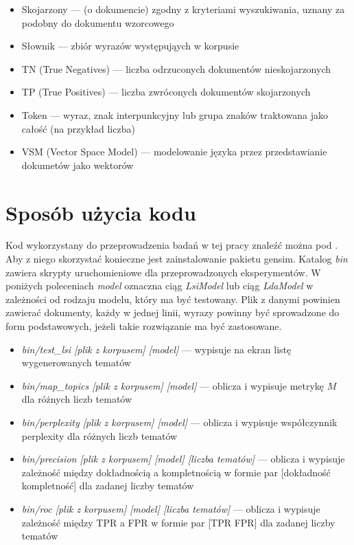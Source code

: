 \documentclass[11pt,a4paper]{article}
\begin{document}
\begin{itemize}
\item Skojarzony --- (o dokumencie) zgodny z kryteriami wyszukiwania, uznany za podobny do dokumentu wzorcowego
\item Słownik --- zbiór wyrazów występująych w korpusie
\item TN (True Negatives) --- liczba odrzuconych dokumentów nieskojarzonych
\item TP (True Positives) --- liczba zwróconych dokumentów skojarzonych
\item Token --- wyraz, znak interpunkcyjny lub grupa znaków traktowana jako całość (na przykład liczba)
\item VSM (Vector Space Model) --- modelowanie języka przez przedstawianie dokumetów jako wektorów
\end{itemize}

\pagebreak

\section{Sposób użycia kodu}
\label{sec:code}

Kod wykorzystany do przeprowadzenia badań w tej pracy znaleźć można pod
\cite{code}. Aby z niego skorzystać konieczne jest zainstalowanie pakietu
gensim. Katalog \emph{bin} zawiera skrypty uruchomieniowe dla przeprowadzonych
eksperymentów. W poniżych poleceniach \emph{model} oznaczna ciąg
\emph{LsiModel} lub ciąg \emph{LdaModel} w zależności od rodzaju modelu, który
ma być testowany. Plik z danymi powinien zawierać dokumenty, każdy w jednej
linii, wyrazy powinny być sprowadzone do form podstawowych, jeżeli takie
rozwiązanie ma być zastosowane.

\begin{itemize}
\item \emph{bin/test\_lsi [plik z korpusem] [model]} --- wypisuje na ekran
listę wygenerowanych tematów
\item \emph{bin/map\_topics [plik z korpusem] [model]} --- oblicza i wypisuje
metrykę $M$ dla różnych liczb tematów
\item \emph{bin/perplexity [plik z korpusem] [model]} --- oblicza i wypisuje
współczynnik perplexity dla różnych liczb tematów
\item \emph{bin/precision [plik z korpusem] [model] [liczba tematów]} ---
oblicza i wypisuje zależność między dokładnością a kompletnością w formie
par [dokładność kompletność] dla zadanej liczby tematów
\item \emph{bin/roc [plik z korpusem] [model] [liczba tematów]} ---
oblicza i wypisuje zależność między TPR a FPR w formie
par [TPR FPR] dla zadanej liczby tematów
\end{itemize}
\end{document}
